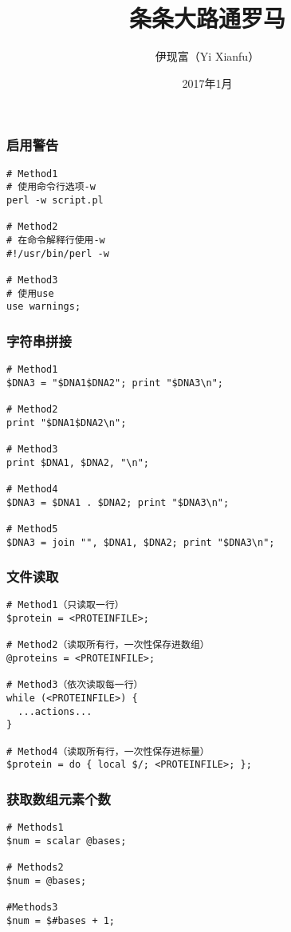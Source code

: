 


\title[条条大路通罗马]{条条大路通罗马}
\author[Yixf]{伊现富（Yi Xianfu）}
\date{2017年1月}

%
\begin{frame}
  \titlepage
\end{frame}

\begin{frame}[fragile]
  \frametitle{启用警告}
\begin{lstlisting}
# Method1
# 使用命令行选项-w
perl -w script.pl

# Method2
# 在命令解释行使用-w
#!/usr/bin/perl -w

# Method3
# 使用use
use warnings;
\end{lstlisting}
\end{frame}

\begin{frame}[fragile]
  \frametitle{字符串拼接}
\begin{lstlisting}
# Method1
$DNA3 = "$DNA1$DNA2"; print "$DNA3\n";

# Method2
print "$DNA1$DNA2\n";

# Method3
print $DNA1, $DNA2, "\n";

# Method4
$DNA3 = $DNA1 . $DNA2; print "$DNA3\n";

# Method5
$DNA3 = join "", $DNA1, $DNA2; print "$DNA3\n";
\end{lstlisting}
\end{frame}

\begin{frame}[fragile]
  \frametitle{文件读取}
\begin{lstlisting}
# Method1（只读取一行）
$protein = <PROTEINFILE>;

# Method2（读取所有行，一次性保存进数组）
@proteins = <PROTEINFILE>;

# Method3（依次读取每一行）
while (<PROTEINFILE>) {
  ...actions...
}

# Method4（读取所有行，一次性保存进标量）
$protein = do { local $/; <PROTEINFILE>; };
\end{lstlisting}
\end{frame}

\begin{frame}[fragile]
  \frametitle{获取数组元素个数}
\begin{lstlisting}
# Methods1
$num = scalar @bases;

# Methods2
$num = @bases;

#Methods3
$num = $#bases + 1;
\end{lstlisting}
\end{frame}

